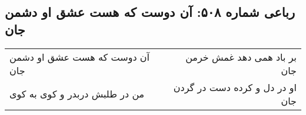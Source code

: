 \begin{center}
\section*{رباعی شماره ۵۰۸: آن دوست که هست عشق او دشمن جان}
\label{sec:sh508}
\begin{longtable}{l p{0.5cm} r}
آن دوست که هست عشق او دشمن جان
&&
بر باد همی دهد غمش خرمن جان
\\
من در طلبش دربدر و کوی به کوی
&&
او در دل و کرده دست در گردن جان
\\
\end{longtable}
\end{center}
